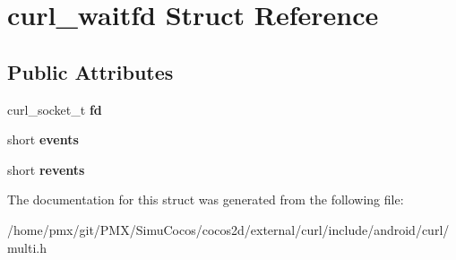 \hypertarget{structcurl__waitfd}{}\section{curl\+\_\+waitfd Struct Reference}
\label{structcurl__waitfd}
\subsection*{Public Attributes}
\begin{DoxyCompactItemize}
\item 
\mbox{\label{structcurl__waitfd_ae4712fac510d50249e1a430a3d160a17}} 
curl\+\_\+socket\+\_\+t {\bfseries fd}
\item 
\mbox{\label{structcurl__waitfd_ac8286d3f03be1a2f2d43a9516251f0f2}} 
short {\bfseries events}
\item 
\mbox{\label{structcurl__waitfd_a14e87b528f4a052ec65edbc14b6ab080}} 
short {\bfseries revents}
\end{DoxyCompactItemize}


The documentation for this struct was generated from the following file\+:\begin{DoxyCompactItemize}
\item 
/home/pmx/git/\+P\+M\+X/\+Simu\+Cocos/cocos2d/external/curl/include/android/curl/multi.\+h\end{DoxyCompactItemize}
